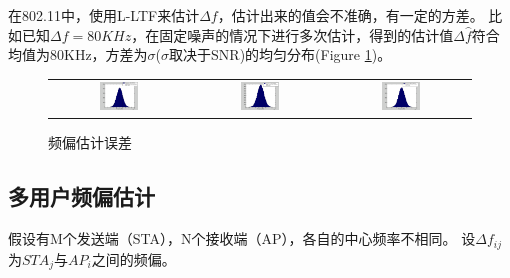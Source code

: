在802.11中，使用L-LTF来估计$\Delta f$，估计出来的值会不准确，有一定的方差。
比如已知$\Delta f = 80 KHz$，在固定噪声的情况下进行多次估计，得到的估计值$\Delta \hat{f}$符合均值为80KHz，方差为$\sigma$($\sigma$取决于SNR)的均匀分布(Figure \ref{fig:cfovar})。
\begin{figure}
	\centering
	\begin{tabular}{ccc}
		\includegraphics[width=0.3\textwidth]{SimCFO1.png} &
		\includegraphics[width=0.3\textwidth]{SimCFO2.png} &
		\includegraphics[width=0.3\textwidth]{SimCFO3.png}
	\end{tabular}
	\caption{频偏估计误差}\label{fig:cfovar}
\end{figure}


%
\subsection{多用户频偏估计}
假设有M个发送端（STA），N个接收端（AP），各自的中心频率不相同。
设$\Delta f_{ij}$为$STA_{j}$与$AP_{i}$之间的频偏。

